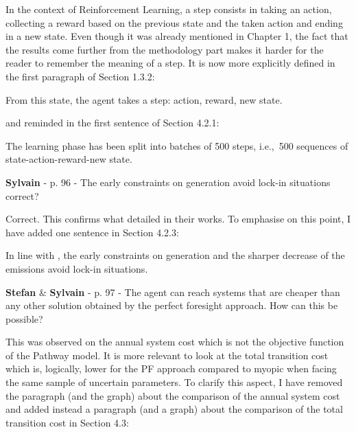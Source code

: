 \documentclass[12pt,a4paper]{article}
\def\ie{i.e.,\ }
\begin{document}
\noindent In the context of Reinforcement Learning, a step consists in taking an action, collecting a reward based on the previous state and the taken action and ending in a new state. Even though it was already mentioned in Chapter 1, the fact that the results come further from the methodology part makes it harder for the reader to remember the meaning of a step. It is now more explicitly defined {\color{blue}in the first paragraph of Section 1.3.2}:

\begin{mdframed}[style=manuscript] %
From this state, the agent takes a step: action, reward, new state.
\end{mdframed}

\noindent and reminded {\color{blue}in the first sentence of Section 4.2.1}:

\begin{mdframed}[style=manuscript] %
The learning phase has been split into batches of 500 steps, \ie 500 sequences of state-action-reward-new state. 
\end{mdframed}

\begin{mdframed}[style=comment] %
{\color{purple} \textbf{Sylvain}} - p. 96 - The early constraints on generation avoid lock-in situations correct?
\end{mdframed}

\noindent Correct. This confirms what \citet{vogt2018starting} detailed in their works. To emphasise on this point, I have added one sentence {\color{blue}in Section 4.2.3}:

\begin{mdframed}[style=manuscript] %
In line with \citet{vogt2018starting}, the early constraints on generation and the sharper decrease of the emissions avoid lock-in situations.
\end{mdframed}

\begin{mdframed}[style=comment] %
{\color{teal} \textbf{Stefan}} \& {\color{purple} \textbf{Sylvain}} - p. 97 - The agent can reach systems that are cheaper than any other solution obtained by the perfect foresight approach. How can this be possible?
\end{mdframed}

\noindent This was observed on the annual system cost which is not the objective function of the Pathway model. It is more relevant to look at the total transition cost which is, logically, lower for the PF approach compared to myopic when facing the same sample of uncertain parameters. To clarify this aspect, I have removed the paragraph (and the graph) about the comparison of the annual system cost and added instead a paragraph (and a graph) about the comparison of the total transition cost {\color{blue}in Section 4.3}:
\end{document}
